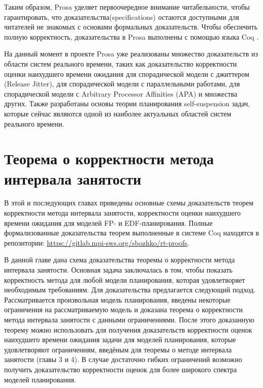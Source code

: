 Таким образом, Prosa уделяет первоочередное внимание читабельности,
  чтобы гарантировать, что доказательства(specifications) остаются доступными для
  читателей не знакомых с основами формальных доказательств. Чтобы обеспечить полную
  корректность, доказательства в Prosa выполнены с помощью языка Coq \cite{Coq}.

На данный момент в проекте Prosa уже реализованы множество доказательств из области систем реального времени, таких как
  доказательство корректности оценки наихудшего времени ожидания для спорадической модели
  с джиттером (Release Jitter), для спорадической модели с параллельными работами,
  для спорадической модели с Arbitrary Processor Affinities (APA) и множества других.
  Также разработаны основы теории планирования self-suspension задач, которые сейчас являются
  одной из наиболее актуальных областей систем реального времени.


\section{Теорема о корректности метода интервала занятости}

В этой и последующих главах приведены основные схемы доказательств теорем корректности метода интервала занятости, корректности оценки наихудшего времени ожидания для моделей FP- и EDF-планирования.
  Полные формализованные доказательства теорем выполненные в системе Coq находятся в репозитории: \url{https://gitlab.mpi-sws.org/sbozhko/rt-proofs}.

В данной главе дана схема доказательства  теоремы о корректности метода интервала
  занятости. Основная задача заключалась в том, чтобы показать корректность метода
  для любой модели планирования,  которая удовлетворяет необходимым требованиям.
  Для доказательства предлагается следующий подход. Рассматривается произвольная модель планирования,
  введены некоторые ограничения на рассматриваемую модель и доказана теорема о корректности
  метода интервала занятости с данными ограничениями. После этого доказанную теорему
  можно использовать для получения доказательств корректности оценок наихудшего
  времени ожидания задачи для моделей планирования, которые удовлетворяют ограничениям,
  введёным для теоремы о методе интервала занятости (главы 3 и 4). В случае достаточно гибких
  ограничений возможно получить доказательство корректности оценок для более широкого
  спектра моделей планирования.

